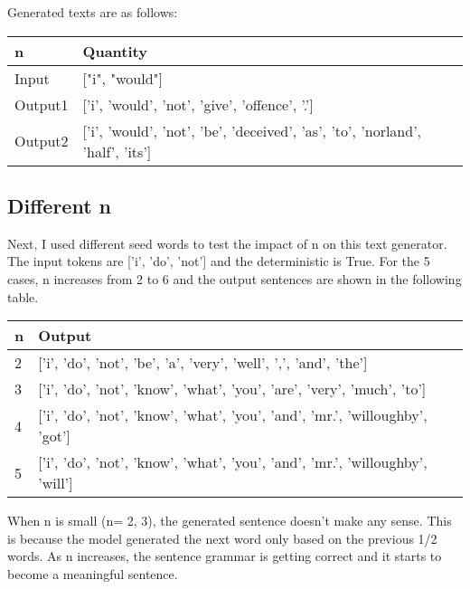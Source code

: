 \documentclass{article}
\begin{document}
Generated texts are as follows:
\newline
\newline

\begin{tabular}{l|l} 
\centering
n & Quantity \\\hline
Input & ["i", "would"] \\
Output1 & ['i', 'would', 'not', 'give', 'offence', '.'] \\
Output2 & ['i', 'would', 'not', 'be', 'deceived', 'as', 'to', 'norland', 'half', 'its'] \\\hline
\end{tabular}
\newline
\newline


\subsection{Different n}
Next, I used different seed words to test the impact of n on this text generator. The input tokens are ['i', 'do', 'not'] and the deterministic is True. For the 5 cases, n increases from 2 to 6 and the output sentences are shown in the following table.  
\newline

\begin{tabular}{l|l}
\centering
n & Output \\\hline
2 & ['i', 'do', 'not', 'be', 'a', 'very', 'well', ',', 'and', 'the'] \\
3 & ['i', 'do', 'not', 'know', 'what', 'you', 'are', 'very', 'much', 'to'] \\
4 & ['i', 'do', 'not', 'know', 'what', 'you', 'and', 'mr.', 'willoughby', 'got'] \\
5 & ['i', 'do', 'not', 'know', 'what', 'you', 'and', 'mr.', 'willoughby', 'will'] \\\hline
\end{tabular}
\newline
\newline

When n is small (n= 2, 3), the generated sentence doesn't make any sense. This is because the model generated the next word only based on the previous 1/2 words. As n increases, the sentence grammar is getting correct and it starts to become a meaningful sentence.  
\end{document}
